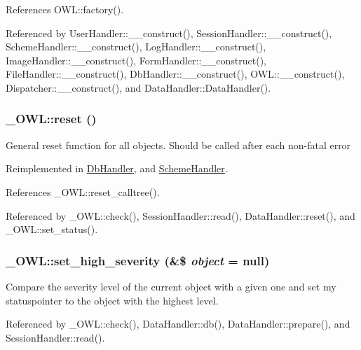 References OWL::factory().



Referenced by UserHandler::\_\-\_\-construct(), SessionHandler::\_\-\_\-construct(), SchemeHandler::\_\-\_\-construct(), LogHandler::\_\-\_\-construct(), ImageHandler::\_\-\_\-construct(), FormHandler::\_\-\_\-construct(), FileHandler::\_\-\_\-construct(), DbHandler::\_\-\_\-construct(), OWL::\_\-\_\-construct(), Dispatcher::\_\-\_\-construct(), and DataHandler::DataHandler().

\subsubsection[{reset}]{\setlength{\rightskip}{0pt plus 5cm}\_\-OWL::reset ()}\label{class__OWL_a2f2a042bcf31965194c03033df0edc9b}
General reset function for all objects. Should be called after each non-\/fatal error 

Reimplemented in \hyperlink{classDbHandler_a9982df4830f05803935bb31bac7fae3d}{DbHandler}, and \hyperlink{classSchemeHandler_aa25feb4a70d67b3d571904be4b2f50bc}{SchemeHandler}.



References \_\-OWL::reset\_\-calltree().



Referenced by \_\-OWL::check(), SessionHandler::read(), DataHandler::reset(), and \_\-OWL::set\_\-status().

\subsubsection[{set\_\-high\_\-severity}]{\setlength{\rightskip}{0pt plus 5cm}\_\-OWL::set\_\-high\_\-severity (\&\$ {\em object} = {\ttfamily null})}\label{class__OWL_a576829692a3b66e3d518853bf43abae3}
Compare the severity level of the current object with a given one and set my statuspointer to the object with the highest level. 

Referenced by \_\-OWL::check(), DataHandler::db(), DataHandler::prepare(), and SessionHandler::read().

